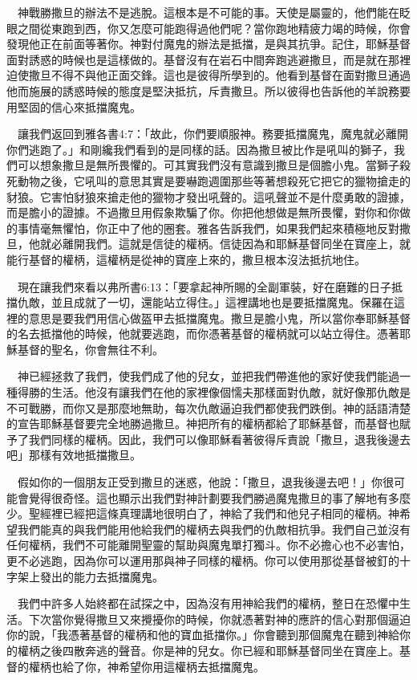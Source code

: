 \documentclass{book}
\begin{document}
　神戰勝撒旦的辦法不是逃脫。這根本是不可能的事。天使是屬靈的，他們能在眨眼之間從東跑到西，你又怎麼可能跑得過他們呢？當你跑地精疲力竭的時候，你會發現他正在前面等著你。神對付魔鬼的辦法是抵擋，是與其抗爭。記住，耶穌基督面對誘惑的時候也是這樣做的。基督沒有在岩石中間奔跑逃避撒旦，而是就在那裡迫使撒旦不得不與他正面交鋒。這也是彼得所學到的。他看到基督在面對撒旦通過他而施展的誘惑時候的態度是堅決抵抗，斥責撒旦。所以彼得也告訴他的羊說務要用堅固的信心來抵擋魔鬼。

　讓我們返回到雅各書4:7：「故此，你們要順服神。務要抵擋魔鬼，魔鬼就必離開你們逃跑了。」和剛纔我們看到的是同樣的話。因為撒旦被比作是吼叫的獅子，我們可以想象撒旦是無所畏懼的。可其實我們沒有意識到撒旦是個膽小鬼。當獅子殺死動物之後，它吼叫的意思其實是要嚇跑週圍那些等著想殺死它把它的獵物搶走的豺狼。它害怕豺狼來搶走他的獵物才發出吼聲的。這吼聲並不是什麼勇敢的證據，而是膽小的證據。不過撒旦用假象欺騙了你。你把他想做是無所畏懼，對你和你做的事情毫無懼怕，你正中了他的圈套。雅各告訴我們，如果我們起來積極地反對撒旦，他就必離開我們。這就是信徒的權柄。信徒因為和耶穌基督同坐在寶座上，就能行基督的權柄，這權柄是從神的寶座上來的，撒旦根本沒法抵抗地住。

　現在讓我們來看以弗所書6:13：「要拿起神所賜的全副軍裝，好在磨難的日子抵擋仇敵，並且成就了一切，還能站立得住。」這裡講地也是要抵擋魔鬼。保羅在這裡的意思是要我們用信心做盔甲去抵擋魔鬼。撒旦是膽小鬼，所以當你奉耶穌基督的名去抵擋他的時候，他就要逃跑，而你憑著基督的權柄就可以站立得住。憑著耶穌基督的聖名，你會無往不利。

　神已經拯救了我們，使我們成了他的兒女，並把我們帶進他的家好使我們能過一種得勝的生活。他沒有讓我們在他的家裡像個懦夫那樣面對仇敵，就好像那仇敵是不可戰勝，而你又是那麼地無助，每次仇敵逼迫我們都使我們跌倒。神的話語清楚的宣告耶穌基督要完全地勝過撒旦。神把所有的權柄都給了耶穌基督，而基督也賦予了我們同樣的權柄。因此，我們可以像耶穌看著彼得斥責說「撒旦，退我後邊去吧」那樣有效地抵擋撒旦。

　假如你的一個朋友正受到撒旦的迷惑，他說：「撒旦，退我後邊去吧！」你很可能會覺得很奇怪。這也顯示出我們對神計劃要我們勝過魔鬼撒旦的事了解地有多麼少。聖經裡已經把這條真理講地很明白了，神給了我們和他兒子相同的權柄。神希望我們能真的與我們能用他給我們的權柄去與我們的仇敵相抗爭。我們自己並沒有任何權柄，我們不可能離開聖靈的幫助與魔鬼單打獨斗。你不必擔心也不必害怕，更不必逃跑，因為你可以運用那與神子同樣的權柄。你可以使用那從基督被釘的十字架上發出的能力去抵擋魔鬼。

　我們中許多人始終都在試探之中，因為沒有用神給我們的權柄，整日在恐懼中生活。下次當你覺得撒旦又來攪擾你的時候，你就憑著對神的應許的信心對那個逼迫你的說，「我憑著基督的權柄和他的寶血抵擋你。」你會聽到那個魔鬼在聽到神給你的權柄之後四散奔逃的聲音。你是神的兒女。你已經和耶穌基督同坐在寶座上。基督的權柄也給了你，神希望你用這權柄去抵擋魔鬼。
\end{document}
